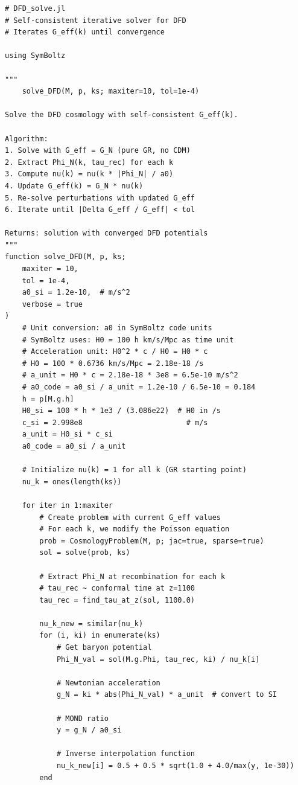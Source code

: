 \documentclass[11pt,a4paper]{article}
\begin{document}
\begin{lstlisting}[caption={Self-consistent iteration for DFD in SymBoltz.jl},label={lst:iterate}]
# DFD_solve.jl
# Self-consistent iterative solver for DFD
# Iterates G_eff(k) until convergence

using SymBoltz

"""
    solve_DFD(M, p, ks; maxiter=10, tol=1e-4)

Solve the DFD cosmology with self-consistent G_eff(k).

Algorithm:
1. Solve with G_eff = G_N (pure GR, no CDM)
2. Extract Phi_N(k, tau_rec) for each k
3. Compute nu(k) = nu(k * |Phi_N| / a0)
4. Update G_eff(k) = G_N * nu(k)
5. Re-solve perturbations with updated G_eff
6. Iterate until |Delta G_eff / G_eff| < tol

Returns: solution with converged DFD potentials
"""
function solve_DFD(M, p, ks;
    maxiter = 10,
    tol = 1e-4,
    a0_si = 1.2e-10,  # m/s^2
    verbose = true
)
    # Unit conversion: a0 in SymBoltz code units
    # SymBoltz uses: H0 = 100 h km/s/Mpc as time unit
    # Acceleration unit: H0^2 * c / H0 = H0 * c
    # H0 = 100 * 0.6736 km/s/Mpc = 2.18e-18 /s
    # a_unit = H0 * c = 2.18e-18 * 3e8 = 6.5e-10 m/s^2
    # a0_code = a0_si / a_unit = 1.2e-10 / 6.5e-10 = 0.184
    h = p[M.g.h]
    H0_si = 100 * h * 1e3 / (3.086e22)  # H0 in /s
    c_si = 2.998e8                        # m/s
    a_unit = H0_si * c_si
    a0_code = a0_si / a_unit

    # Initialize nu(k) = 1 for all k (GR starting point)
    nu_k = ones(length(ks))

    for iter in 1:maxiter
        # Create problem with current G_eff values
        # For each k, we modify the Poisson equation
        prob = CosmologyProblem(M, p; jac=true, sparse=true)
        sol = solve(prob, ks)

        # Extract Phi_N at recombination for each k
        # tau_rec ~ conformal time at z=1100
        tau_rec = find_tau_at_z(sol, 1100.0)

        nu_k_new = similar(nu_k)
        for (i, ki) in enumerate(ks)
            # Get baryon potential
            Phi_N_val = sol(M.g.Phi, tau_rec, ki) / nu_k[i]

            # Newtonian acceleration
            g_N = ki * abs(Phi_N_val) * a_unit  # convert to SI

            # MOND ratio
            y = g_N / a0_si

            # Inverse interpolation function
            nu_k_new[i] = 0.5 + 0.5 * sqrt(1.0 + 4.0/max(y, 1e-30))
        end


\end{lstlisting}
\end{document}
